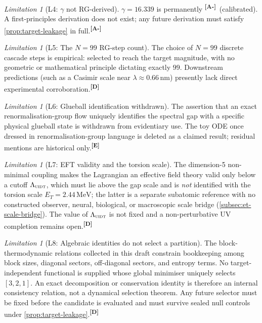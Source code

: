 \documentclass[12pt,a4paper,twoside]{article}
\theoremstyle{plain}
\theoremstyle{definition}
\theoremstyle{remark}
\newtheorem{limitation}[theorem]{Limitation}
\newcommand{\UIDT}{\textsc{uidt}} %
\newcommand{\MeV}{\,\mathrm{MeV}}
\newcommand{\catmark}[1]{\textsuperscript{\textsf{\textbf{[#1]}}}}
\newcommand{\GammaGeom}{16.339} %
\newcommand{\ETorsion}{2.44\MeV} %
\begin{document}
\begin{limitation}[L4: $\gamma$ not RG-derived]
\label{lim:L4}
$\gamma = \GammaGeom$ is permanently \catmark{A-}\ (calibrated). A
first-principles derivation does not exist; any future derivation must
satisfy \cref{prop:target-leakage} in full.\catmark{A-}
\end{limitation}

\begin{limitation}[L5: The $N=99$ RG-step count]
\label{lim:L5}
The choice of $N=99$ discrete cascade steps is empirical: selected to
reach the target magnitude, with no geometric or mathematical principle
dictating exactly $99$. Downstream predictions (such as a Casimir scale
near $\lambda \approx 0.66\,\mathrm{nm}$) presently lack direct
experimental corroboration.\catmark{D}
\end{limitation}

\begin{limitation}[L6: Glueball identification withdrawn]
\label{lim:L6}
The assertion that an exact renormalisation-group flow uniquely
identifies the spectral gap with a specific physical glueball state is
withdrawn from evidentiary use. The toy ODE once dressed in
renormalisation-group language is deleted as a claimed result; residual
mentions are historical only.\catmark{E}
\end{limitation}

\begin{limitation}[L7: EFT validity and the torsion scale]
\label{lim:L7}
The dimension-5 non-minimal coupling makes the Lagrangian an effective
field theory valid only below a cutoff $\Lambda_{\UIDT}$, which must lie
above the gap scale and is \emph{not} identified with the torsion scale
$E_T = \ETorsion$; the latter is a separate subatomic reference with no
constructed observer, neural, biological, or macroscopic scale bridge
(\cref{subsec:et-scale-bridge}). The value of $\Lambda_{\UIDT}$
is not fixed and a non-perturbative UV completion remains
open.\catmark{D}
\end{limitation}

\begin{limitation}[L8: Algebraic identities do not select a partition]
\label{lim:L8}
The block-thermodynamic relations collected in this draft constrain
bookkeeping among block sizes, diagonal sectors, off-diagonal sectors,
and entropy terms. No target-independent functional is supplied whose
global minimiser uniquely selects $[3,2,1]$. An exact decomposition or
conservation identity is therefore an internal consistency relation, not
a dynamical selection theorem. Any future selector must be fixed before
the candidate is evaluated and must survive sealed null controls under
\cref{prop:target-leakage}.\catmark{D}
\end{limitation}
\end{document}
